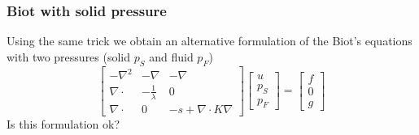 \begin{frame}
\frametitle{Biot with solid pressure}
Using the same trick we obtain an alternative formulation of
the Biot's equations with two pressures (solid $p_S$ and fluid $p_F$)
\[
\left[
\begin{array}{ccc}
-\nabla^2 & -\nabla & -\nabla \\
\nabla\cdot & -\frac{1}{\lambda} & 0  \\ 
\nabla\cdot & 0 &  -s + \nabla\cdot K \nabla   
\end{array}
\right]
\left[
\begin{array}{c} u \\ p_S \\ p_F \end{array} 
\right]
= 
\left[
\begin{array}{c} f \\ 0 \\ g \end{array} 
\right]
\]
\alert{Is this formulation ok?} 
\end{frame}
